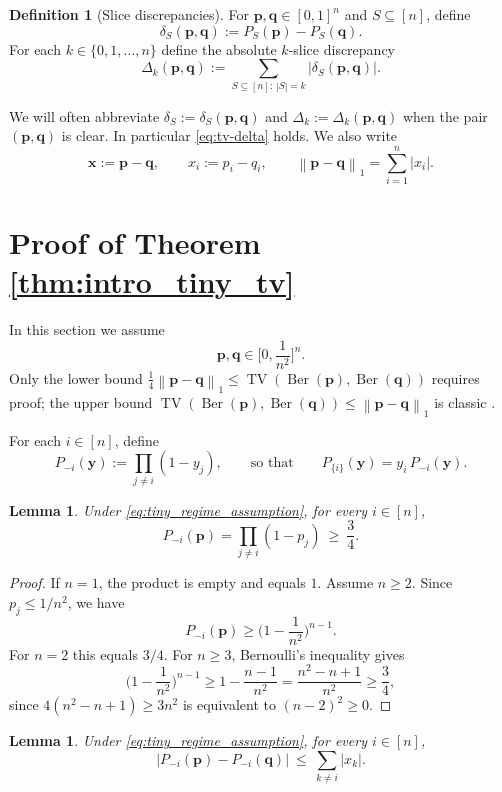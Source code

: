 \documentclass[11pt]{amsart}
\numberwithin{equation}{section}
\newtheorem{lemma}[theorem]{Lemma}
\theoremstyle{definition}
\newtheorem{definition}[theorem]{Definition}
\newcommand{\TV}{\operatorname{TV}}
\newcommand{\Ber}{\operatorname{Ber}}
\newcommand{\abs}[1]{\left|#1\right|}
\newcommand{\vct}[1]{\mathbf{#1}}
\newcommand{\pvec}{\vct{p}}
\newcommand{\qvec}{\vct{q}}
\newcommand{\xvec}{\vct{x}}
\newcommand{\yvec}{\vct{y}}
\newcommand{\normone}[1]{\left\lVert #1 \right\rVert_1}
\begin{document}
\begin{definition}[Slice discrepancies]\label{def:slice_discrepancies}
For $\pvec,\qvec\in[0,1]^n$ and $S\subseteq[n]$, define
\[
\delta_S(\pvec,\qvec):=P_S(\pvec)-P_S(\qvec).
\]
For each $k\in\{0,1,\dots,n\}$ define the absolute $k$-slice discrepancy
\[
\Delta_k(\pvec,\qvec):=\sum_{S\subseteq[n]:\,|S|=k}\abs{\delta_S(\pvec,\qvec)}.
\]
\end{definition}

We will often abbreviate $\delta_S:=\delta_S(\pvec,\qvec)$ and $\Delta_k:=\Delta_k(\pvec,\qvec)$ when the pair $(\pvec,\qvec)$ is clear. In particular \eqref{eq:tv-delta} holds.
We also write
\[
\xvec:=\pvec-\qvec,\qquad x_i:=p_i-q_i,\qquad \normone{\pvec-\qvec}=\sum_{i=1}^n\abs{x_i}.
\]



\section{Proof of Theorem \ref{thm:intro_tiny_tv}}
\label{sec:tiny}
In this section we assume
\begin{equation}\label{eq:tiny_regime_assumption}
\pvec,\qvec\in\Big[0,\frac{1}{n^2}\Big]^n.
\end{equation}
Only the lower bound 
$
\frac14\normone{\pvec-\qvec}
\le
\TV(\Ber(\pvec),\Ber(\qvec))
$
requires proof;
the upper bound
$
\TV(\Ber(\pvec),\Ber(\qvec))
\le
\normone{\pvec-\qvec}
$ is classic \cite[Disp. (1.4)]{kon25tens}.

For each $i\in[n]$, define
\[
P_{-i}(\yvec):=\prod_{j\neq i}(1-y_j),\qquad \text{so that}\qquad P_{\{i\}}(\yvec)=y_i\,P_{-i}(\yvec).
\]

\begin{lemma}
\label{lem:tiny_product_lb}
Under \eqref{eq:tiny_regime_assumption}, for every $i\in[n]$,
\[
P_{-i}(\pvec)=\prod_{j\neq i}(1-p_j)\ \ge\ \frac34.
\]
\end{lemma}

\begin{proof}
If $n=1$, the product is empty and equals $1$.
Assume $n\ge 2$.
Since $p_j\le 1/n^2$, we have
\[
P_{-i}(\pvec)\ge \Big(1-\frac1{n^2}\Big)^{n-1}.
\]
For $n=2$ this equals $3/4$.
For $n\ge 3$, Bernoulli's inequality gives
\[
\Big(1-\frac1{n^2}\Big)^{n-1}\ge 1-\frac{n-1}{n^2}=\frac{n^2-n+1}{n^2}\ge \frac34,
\]
since $4(n^2-n+1)\ge 3n^2$ is equivalent to $(n-2)^2\ge 0$.
\end{proof}

\begin{lemma}
\label{lem:tiny_product_lipschitz}
Under \eqref{eq:tiny_regime_assumption}, for every $i\in[n]$,
\[
\abs{P_{-i}(\pvec)-P_{-i}(\qvec)}\ \le\ \sum_{k\neq i}\abs{x_k}.
\]
\end{lemma}
\end{document}
